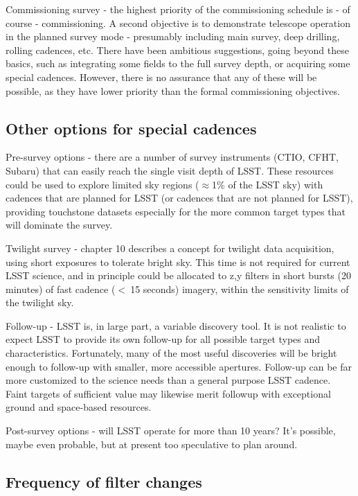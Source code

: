 Commissioning survey - the highest priority of the commissioning
schedule is - of course - commissioning.  A second objective is to
demonstrate telescope operation in the planned survey mode - presumably
including main survey, deep drilling, rolling cadences, etc.  There have
been ambitious suggestions, going beyond these basics, such as
integrating some fields to the full survey depth, or acquiring some
special cadences.  However, there is no assurance that any of these will
be possible, as they have lower priority than the formal commissioning
objectives.

\subsection{Other options for special cadences}

Pre-survey options - there are a number of survey instruments (CTIO,
CFHT, Subaru) that can easily reach the single visit depth of LSST.
These resources could be used to explore limited sky regions
($\approx$1\% of the LSST sky) with cadences that are planned for LSST
(or cadences that are not planned for LSST), providing touchstone
datasets especially for the more common target types that will dominate
the survey.

Twilight survey - chapter 10 describes a concept for twilight data
acquisition, using short exposures to tolerate bright sky.  This time is
not required for current LSST science, and in principle could be
allocated to z,y filters in short bursts (20 minutes) of fast cadence
($<~$15 seconds) imagery, within the sensitivity limits of the twilight
sky.

Follow-up - LSST is, in large part, a variable discovery tool.  It is
not realistic to expect LSST to provide its own follow-up for all
possible target types and characteristics. Fortunately, many of the most
useful discoveries will be bright enough to follow-up with smaller, more
accessible apertures.  Follow-up can be far more customized to the
science needs than a general purpose LSST cadence.  Faint targets of
sufficient value may likewise merit followup with exceptional  ground
and space-based resources.

Post-survey options - will LSST operate for more than 10 years? It's
possible, maybe even probable, but at present too speculative to plan
around.

\subsection{Frequency of filter changes}

